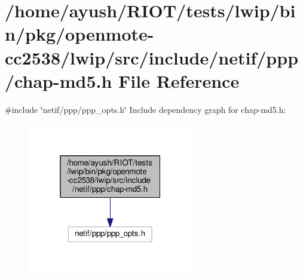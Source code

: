 \hypertarget{openmote-cc2538_2lwip_2src_2include_2netif_2ppp_2chap-md5_8h}{}\section{/home/ayush/\+R\+I\+O\+T/tests/lwip/bin/pkg/openmote-\/cc2538/lwip/src/include/netif/ppp/chap-\/md5.h File Reference}
\label{openmote-cc2538_2lwip_2src_2include_2netif_2ppp_2chap-md5_8h}
{\ttfamily \#include \char`\"{}netif/ppp/ppp\+\_\+opts.\+h\char`\"{}}\newline
Include dependency graph for chap-\/md5.h\+:
\nopagebreak
\begin{figure}[H]
\begin{center}
\leavevmode
\includegraphics[width=205pt]{openmote-cc2538_2lwip_2src_2include_2netif_2ppp_2chap-md5_8h__incl}
\end{center}
\end{figure}
